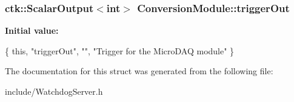 \subsubsection[{\texorpdfstring{trigger\+Out}{triggerOut}}]{\setlength{\rightskip}{0pt plus 5cm}ctk\+::\+Scalar\+Output$<$int$>$ Conversion\+Module\+::trigger\+Out}\hypertarget{structConversionModule_aa013ad73344fbd9ab5d34c921a4e5bc7}{}\label{structConversionModule_aa013ad73344fbd9ab5d34c921a4e5bc7}
{\bfseries Initial value\+:}
\begin{DoxyCode}
\{ \textcolor{keyword}{this}, \textcolor{stringliteral}{"triggerOut"}, \textcolor{stringliteral}{""},
      \textcolor{stringliteral}{"Trigger for the MicroDAQ module"} \}
\end{DoxyCode}


The documentation for this struct was generated from the following file\+:\begin{DoxyCompactItemize}
\item 
include/Watchdog\+Server.\+h\end{DoxyCompactItemize}
